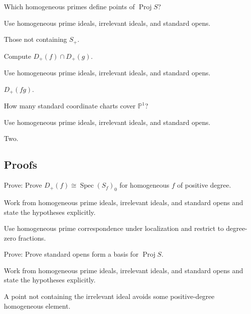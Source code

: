 \begin{exercise}\label{exr:vi35-expand-03}
Which homogeneous primes define points of $\operatorname{Proj}S$?
\end{exercise}
\begin{hint}
Use homogeneous prime ideals, irrelevant ideals, and standard opens.
\end{hint}
\begin{solution}
Those not containing $S_+$.
\end{solution}

\begin{exercise}[Intersection]\label{exr:vi35-expand-04}
Compute $D_+(f)\cap D_+(g)$.
\end{exercise}
\begin{hint}
Use homogeneous prime ideals, irrelevant ideals, and standard opens.
\end{hint}
\begin{solution}
$D_+(fg)$.
\end{solution}

\begin{exercise}\label{exr:vi35-expand-05}
How many standard coordinate charts cover $\mathbb P^1$?
\end{exercise}
\begin{hint}
Use homogeneous prime ideals, irrelevant ideals, and standard opens.
\end{hint}
\begin{solution}
Two.
\end{solution}

\subsection*{Proofs}

\begin{exercise}\label{exr:vi35-expand-06}
Prove: Prove $D_+(f)\cong\operatorname{Spec}(S_f)_0$ for homogeneous $f$ of positive degree.
\end{exercise}
\begin{hint}
Work from homogeneous prime ideals, irrelevant ideals, and standard opens and state the hypotheses explicitly.
\end{hint}
\begin{solution}
Use homogeneous prime correspondence under localization and restrict to degree-zero fractions.
\end{solution}

\begin{exercise}[Basis]\label{exr:vi35-expand-07}
Prove: Prove standard opens form a basis for $\operatorname{Proj}S$.
\end{exercise}
\begin{hint}
Work from homogeneous prime ideals, irrelevant ideals, and standard opens and state the hypotheses explicitly.
\end{hint}
\begin{solution}
A point not containing the irrelevant ideal avoids some positive-degree homogeneous element.
\end{solution}

